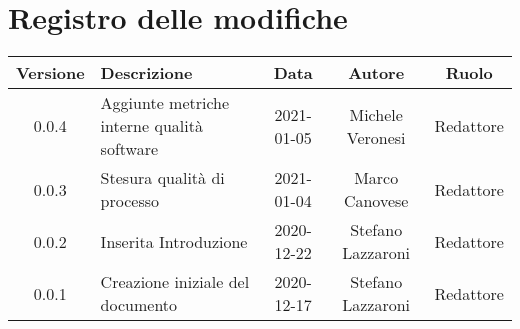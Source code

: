 \section*{Registro delle modifiche}

\begin{center}
	\begin{longtable}{|c|p{5cm}|c|c|c|}
	\hline
	\rowcolor{lighter-grayer}
	\textbf{Versione} & \textbf{Descrizione} & \textbf{Data} & \textbf{Autore} & \textbf{Ruolo} \\
	\hline
	\endfirsthead


	\hline
	0.0.4 & Aggiunte metriche interne qualità software & 2021-01-05 & Michele Veronesi & Redattore \\
	0.0.3 & Stesura qualità di processo & 2021-01-04 & Marco Canovese & Redattore \\
	0.0.2 & Inserita Introduzione & 2020-12-22 & Stefano Lazzaroni & Redattore\\
    0.0.1 & Creazione iniziale del documento & 2020-12-17 & Stefano Lazzaroni & Redattore\\
	\hline

	\end{longtable}
\end{center}